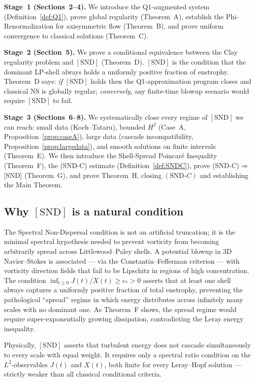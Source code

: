 \documentclass[11pt]{article}
\begin{document}
\medskip\noindent\textbf{Stage~1 (Sections~2--4).}
We introduce the Q1-augmented system (Definition~\ref{def:Q1}),
prove global regularity (Theorem~A), establish the
Phi-Renormalization for axisymmetric flow (Theorem~B),
and prove uniform convergence to classical solutions (Theorem~C).

\medskip\noindent\textbf{Stage~2 (Section~5).}
We prove a conditional equivalence between the Clay regularity
problem and $[\mathrm{SND}]$ (Theorem~D). $[\mathrm{SND}]$ is the condition that the
dominant LP-shell always holds a uniformly positive fraction of
enstrophy. Theorem~D says: \emph{if} $[\mathrm{SND}]$ holds then
the Q1-approximation program closes and classical NS is globally
regular; \emph{conversely}, any finite-time blowup scenario
would require $[\mathrm{SND}]$ to fail.

\medskip\noindent\textbf{Stage~3 (Sections~6--8).}
We systematically close every regime of $[\mathrm{SND}]$ we can reach:
small data (Koch--Tataru), bounded $H^2$ (Case~A, Proposition~\ref{prop:caseA}),
large data (cascade incompatibility, Proposition~\ref{prop:largedata}),
and smooth solutions on finite intervals (Theorem~E).
We then introduce the Shell-Spread Poincar\'e Inequality (Theorem~F),
the (SND-C) estimate (Definition~\ref{def:SNDC}),
prove (SND-C)$\Rightarrow$[SND] (Theorem~G),
and prove Theorem~H, closing $(\mathrm{SND}\text{-}C)$ and establishing the Main Theorem.


\subsection{Why $[\mathrm{SND}]$ is a natural condition}

The Spectral Non-Dispersal condition is not an artificial truncation;
it is the minimal spectral hypothesis needed to prevent vorticity
from becoming arbitrarily spread across Littlewood--Paley shells.
A potential blowup in 3D Navier--Stokes is associated --- via the
Constantin--Fefferman criterion --- with vorticity direction fields
that fail to be Lipschitz in regions of high concentration.
The condition $\inf_{t\ge0}J(t)/X(t)\ge c_*>0$ asserts that at
least one shell always captures a uniformly positive fraction of
total enstrophy, preventing the pathological ``spread'' regime in
which energy distributes across infinitely many scales with no
dominant one. As Theorem~F shows, the spread regime would require
super-exponentially growing dissipation, contradicting the Leray
energy inequality.

Physically, $[\mathrm{SND}]$ asserts that turbulent energy does not
cascade simultaneously to every scale with equal weight.
It requires only a spectral ratio condition on the $L^2$-observables
$J(t)$ and $X(t)$, both finite for every Leray--Hopf solution ---
strictly weaker than all classical conditional criteria.
\end{document}
